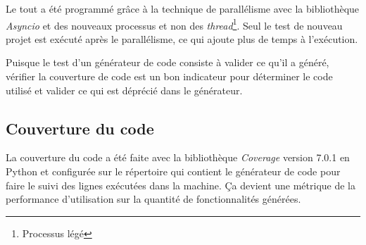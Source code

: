 Le tout a été programmé grâce à la technique de parallélisme avec la bibliothèque \textit{Asyncio} et des nouveaux processus et non des \textit{thread}\footnote{Processus légé}. Seul le test de nouveau projet est exécuté après le parallélisme, ce qui ajoute plus de temps à l’exécution.

Puisque le test d’un générateur de code consiste à valider ce qu’il a généré, vérifier la couverture de code est un bon indicateur pour déterminer le code utilisé et valider ce qui est déprécié dans le générateur.

\subsection{Couverture du code}
La couverture du code a été faite avec la bibliothèque \textit{Coverage} version 7.0.1 en Python et configurée sur le répertoire qui contient le générateur de code pour faire le suivi des lignes exécutées dans la machine. Ça devient une métrique de la performance d’utilisation sur la quantité de fonctionnalités générées.
